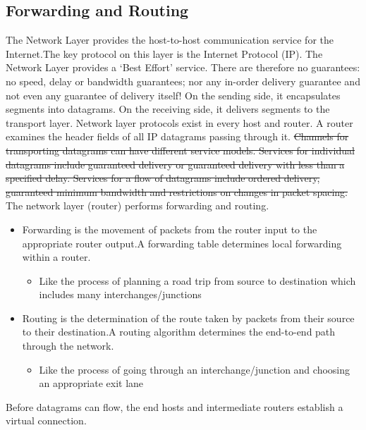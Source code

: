 \subsection{Forwarding and Routing}
The Network Layer provides the host-to-host communication service for the Internet.The key protocol on this layer is the Internet Protocol (IP).
\newline
The Network Layer provides a ‘Best Effort’ service.
\newline
There are therefore no guarantees: no speed, delay or bandwidth guarantees; nor any in-order delivery guarantee and not even any guarantee of delivery itself!
\newline
On the sending side, it encapsulates segments into datagrams.
On the receiving side, it delivers segments to the transport layer.
Network layer protocols exist in every host and router.
A router examines the header fields of all IP datagrams passing through it.
\newline
\sout{
Channels for transporting datagrams can have different service models.
Services for individual datagrams include guaranteed delivery or guaranteed delivery with less than a specified delay.
Services for a flow of datagrams include ordered delivery, guaranteed minimum bandwidth and restrictions on changes in packet spacing.
}
\newline
The network layer (router) performs forwarding and routing.
\begin{itemize}
  \item Forwarding is the movement of packets from the router input to the appropriate router output.A forwarding table determines local forwarding within a router.
    \begin{itemize}
      \item Like the process of planning a road trip from source to destination which includes many interchanges/junctions
    \end{itemize}
  \item Routing is the determination of the route taken by packets from their source to their destination.A routing algorithm determines the end-to-end path through the network.
    \begin{itemize}
      \item Like the process of going through an interchange/junction and choosing an appropriate exit lane
    \end{itemize}
\end{itemize}
Before datagrams can flow, the end hosts and intermediate routers establish a virtual connection.

